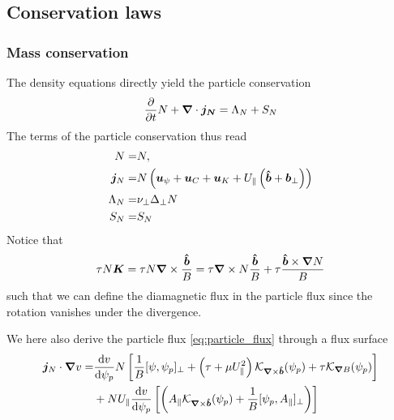 \subsection{Conservation laws} \label{sec:conservation}
\subsubsection{Mass conservation}
The density equations directly yield the particle conservation
\begin{align} \label{eq:mass_theorem}
  \frac{\partial}{\partial t} N
  + {\boldsymbol{\nabla}}\cdot{\boldsymbol{ j_{N}}}
  =  \Lambda_{N}+S_{N}
\end{align}
The terms of the particle conservation thus read
\begin{align}
  N= & N,\\
  \vec j_{N} =& N\left(
  \vec u_\psi + \vec u_C + \vec u_{K} +U_\parallel\left(\bhat+{\vec b}_\perp\right)  \right)
\label{eq:particle_flux}\\
  \Lambda_{N} =&
  \nu_\perp\Delta_\perp N%
\\
  S_{N} =&  S_{N}
\end{align}
Notice that
\begin{align}
\tau N {\boldsymbol{K}} = \tau N{\boldsymbol{\nabla}}\times\frac{\bm{\hat{b}}}{B} = \tau {\boldsymbol{\nabla}}\times N\frac{\bm{\hat{b}}}{B} + \tau \frac{\bm{\hat{b}}\times{\boldsymbol{\nabla}} N}{B}
\label{}
\end{align}
such that we can define the diamagnetic flux in the particle flux since
the rotation vanishes under the divergence.

We here also derive the particle flux \eqref{eq:particle_flux} through a flux surface
\begin{align} \label{eq:radial_particle_flux}
 \vec j_{N}\cn v %
 =&
  \frac{\d v}{\d \psi_p} N\left[\frac{1}{B}[\psi, \psi_p]_\perp + \left(\tau + \mu U_\parallel^2\right)
   \mathcal K_{\vn\times\bhat}(\psi_p) + \tau  \mathcal K_{\vn B}(\psi_p) \right] \nonumber\\
 &+ NU_\parallel\frac{\d v}{\d \psi_p}\left [\left( A_\parallel \mathcal
 K_{\vn\times\bhat}(\psi_p) + \frac{1}{B}[\psi_p, A_\parallel]_\perp\right) \right]
\end{align}

